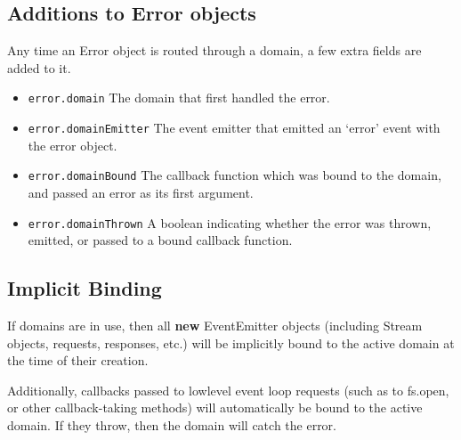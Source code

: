 \begin{Shaded}
\begin{Highlighting}[]
 
  \NormalTok{(}\NormalTok{) \{}
     \NormalTok{:}
      \NormalTok{() \{}
        \NormalTok{();}
      \NormalTok{\});}
      \NormalTok{;}
    \NormalTok{:}
      \NormalTok{(}\NormalTok{);}
  \NormalTok{\}}
\NormalTok{\}}
\end{Highlighting}
\end{Shaded}

\subsection{Additions to Error objects}

Any time an Error object is routed through a domain, a few extra fields
are added to it.

\begin{itemize}
\item
  \texttt{error.domain} The domain that first handled the error.
\item
  \texttt{error.domainEmitter} The event emitter that emitted an `error'
  event with the error object.
\item
  \texttt{error.domainBound} The callback function which was bound to
  the domain, and passed an error as its first argument.
\item
  \texttt{error.domainThrown} A boolean indicating whether the error was
  thrown, emitted, or passed to a bound callback function.
\end{itemize}

\subsection{Implicit Binding}

If domains are in use, then all \textbf{new} EventEmitter objects
(including Stream objects, requests, responses, etc.) will be implicitly
bound to the active domain at the time of their creation.

Additionally, callbacks passed to lowlevel event loop requests (such as
to fs.open, or other callback-taking methods) will automatically be
bound to the active domain. If they throw, then the domain will catch
the error.

